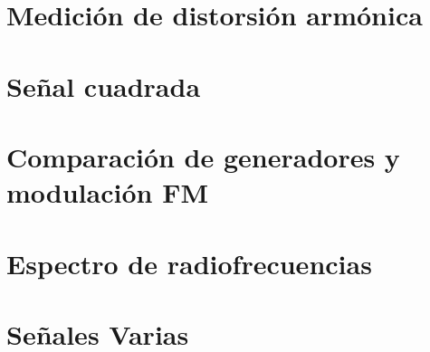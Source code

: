 







\tableofcontents
\newpage


\section{Medición de distorsión armónica}
	
	
\section{Señal cuadrada}
	
	
\section{Comparación de generadores y modulación FM}
	
	
\section{Espectro de radiofrecuencias}
	

\section{Señales Varias}
	

